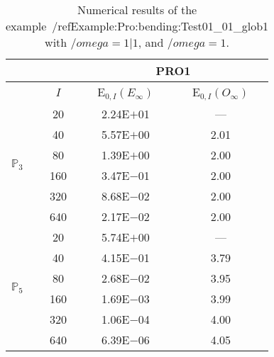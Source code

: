 \begin{table}[H]
\caption{Numerical results of the example~/ref{Example:Pro:bending:Test01_01_glob1} with $/omega=1|1$, and $/omega=1$.}
\setlength{\tabcolsep}{5pt}
\centering
\begin{tabular}{@{}l c c c@{}}
\toprule
 &  & \multicolumn{2}{c}{PRO1}\\
\midrule
 & $I$ & E$_{0,I}(E_{\infty})$ & E$_{0,I}(O_{\infty})$\\
\midrule
\multirow{6}{*}{$\mathbb{P}_{3}$}
 & 20 & 2.24E$+$01 & ---\\
 & 40 & 5.57E$+$00 & 2.01\\
 & 80 & 1.39E$+$00 & 2.00\\
 & 160 & 3.47E$-$01 & 2.00\\
 & 320 & 8.68E$-$02 & 2.00\\
 & 640 & 2.17E$-$02 & 2.00\\
\midrule
\multirow{6}{*}{$\mathbb{P}_{5}$}
 & 20 & 5.74E$+$00 & ---\\
 & 40 & 4.15E$-$01 & 3.79\\
 & 80 & 2.68E$-$02 & 3.95\\
 & 160 & 1.69E$-$03 & 3.99\\
 & 320 & 1.06E$-$04 & 4.00\\
 & 640 & 6.39E$-$06 & 4.05\\
\bottomrule
\end{tabular}
\label{Table:PRO:test_01_01_test31_pro1}
\end{table}
